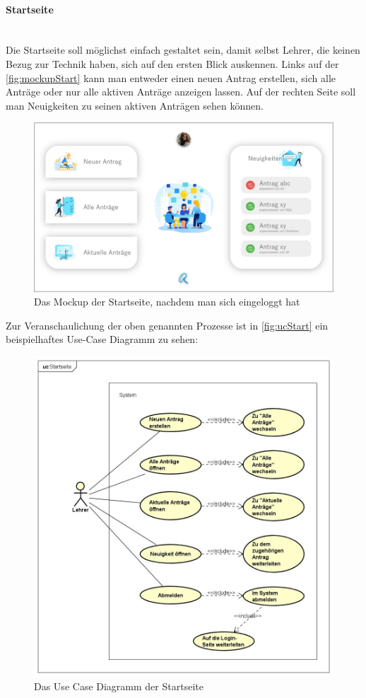 \paragraph{Startseite}
~\\
Die Startseite soll möglichst einfach gestaltet sein, damit selbst Lehrer, die keinen Bezug zur Technik haben, sich auf den ersten Blick auskennen. Links auf der \autoref{fig:mockupStart} kann man entweder einen neuen Antrag erstellen, sich alle Anträge oder nur alle aktiven Anträge anzeigen lassen. Auf der rechten Seite soll man Neuigkeiten zu seinen aktiven Anträgen sehen können.
\begin{figure}[H]
	\centering
	\includegraphics[width=1\linewidth]{images/ldehner_konzept/Mockup-Startseite-eingeloggt}
	\caption[Mockup Startseite]{Das Mockup der Startseite, nachdem man sich eingeloggt hat}
	\label{fig:mockupStart}
\end{figure}
Zur Veranschaulichung der oben genannten Prozesse ist in \autoref{fig:ucStart} ein beispielhaftes Use-Case Diagramm zu sehen: 
\begin{figure}[H]
	\centering
	\includegraphics[width=1\linewidth]{images/ldehner_konzept/uc-start}
	\caption[Use Case Diagramm Login]{Das Use Case Diagramm der Startseite}
	\label{fig:ucStart}
\end{figure}
